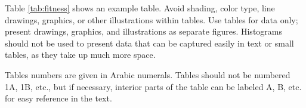 \documentclass[9pt,twocolumn,twoside,lineno]{gsajnl}
\begin{document}
Table \ref{tab:fitness} shows an example table. Avoid shading, color type, line drawings, graphics, or other illustrations within tables. Use tables for data only; present drawings, graphics, and illustrations as separate figures. Histograms should not be used to present data that can be captured easily in text or small tables, as they take up much more space.  

Tables numbers are given in Arabic numerals. Tables should not be numbered 1A, 1B, etc., but if necessary, interior parts of the table can be labeled A, B, etc. for easy reference in the text.  



\end{document}
